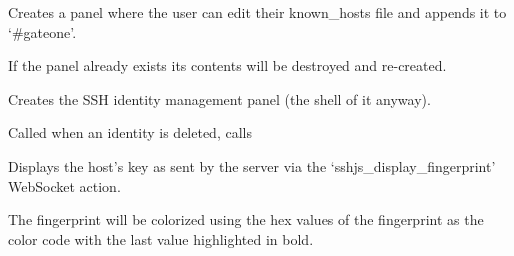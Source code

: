 \documentclass[letterpaper,10pt,openany]{sphinxmanual}
\begin{document}

\begin{fulllineitems}
\label{Applications/terminal/plugin_ssh:GateOne.SSH.createKHPanel}
Creates a panel where the user can edit their known\_hosts file and appends it to `\#gateone'.

If the panel already exists its contents will be destroyed and re-created.

\end{fulllineitems}


\begin{fulllineitems}
\label{Applications/terminal/plugin_ssh:GateOne.SSH.createPanel}
Creates the SSH identity management panel (the shell of it anyway).

\end{fulllineitems}


\begin{fulllineitems}
\label{Applications/terminal/plugin_ssh:GateOne.SSH.deleteCompleteAction}
Called when an identity is deleted, calls {\hyperref[Applications/terminal/plugin_ssh:GateOne.SSH.loadIDs]{}}

\end{fulllineitems}


\begin{fulllineitems}
\label{Applications/terminal/plugin_ssh:GateOne.SSH.displayHostFingerprint}
Displays the host's key as sent by the server via the `sshjs\_display\_fingerprint' WebSocket action.

The fingerprint will be colorized using the hex values of the fingerprint as the color code with the last value highlighted in bold.

\end{fulllineitems}

\end{document}
